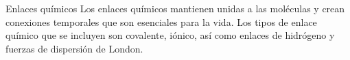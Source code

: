 \begin{infocard}{Enlaces químicos}
    Los enlaces químicos mantienen unidas a las moléculas y crean conexiones temporales que son esenciales para la vida. Los tipos de enlace químico que se incluyen son covalente, iónico, así como enlaces de hidrógeno y fuerzas de dispersión de London.
\end{infocard}